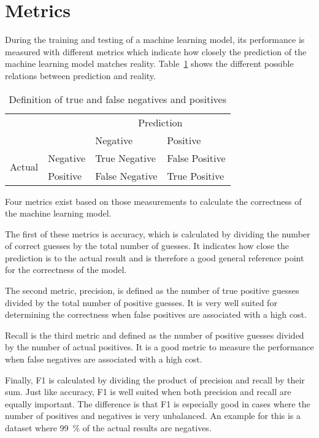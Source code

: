 \section{Metrics}\label{sec:metrics}
During the training and testing of a machine learning model, its performance is measured with different metrics which indicate how closely the prediction of the machine learning model matches reality. Table~\ref{table:true-false-neg-pos} shows the different possible relations between prediction and reality.

\begin{table}[ht]
  \centering
  \caption{Definition of true and false negatives and positives}
  \begin{tabular}{ll|l|l} %
                            & \multicolumn{1}{c}{} & \multicolumn{2}{c}{Prediction}                  \\
                            &                      & Negative                       & Positive       \\ \cline{2-4}
    \multirow{2}{*}{Actual} & Negative             & True Negative                  & False Positive \\ \cline{2-4}
                            & Positive             & False Negative                 & True Positive  \\
  \end{tabular}\label{table:true-false-neg-pos}
\end{table}

Four metrics exist based on those measurements to calculate the correctness of the machine learning model.

The first of these metrics is accuracy, which is calculated by dividing the number of correct guesses by the total number of guesses. It indicates how close the prediction is to the actual result and is therefore a good general reference point for the correctness of the model.

The second metric, precision, is defined as the number of true positive guesses divided by the total number of positive guesses. It is very well suited for determining the correctness when false positives are associated with a high cost.

Recall is the third metric and defined as the number of positive guesses divided by the number of actual positives. It is a good metric to measure the performance when false negatives are associated with a high cost.

Finally, F1 is calculated by dividing the product of precision and recall by their sum. Just like accuracy, F1 is well suited when both precision and recall are equally important. The difference is that F1 is especially good in cases where the number of positives and negatives is very unbalanced. An example for this is a dataset where \SI{99}{\percent} of the actual results are negatives.
